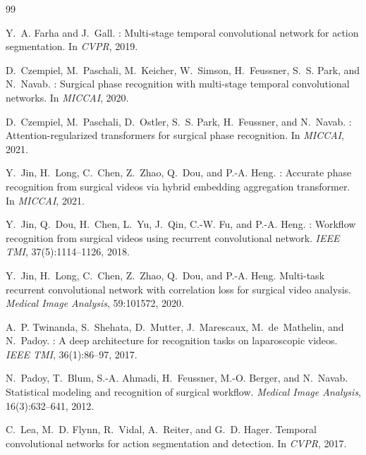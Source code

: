 \documentclass[10pt,twocolumn]{article}
\begin{document}

\begin{thebibliography}{99}

Y.~A. Farha and J.~Gall.
: Multi-stage temporal convolutional network for action segmentation.
\newblock In \emph{CVPR}, 2019.

D.~Czempiel, M.~Paschali, M.~Keicher, W.~Simson, H.~Feussner, S.~S. Park, and N.~Navab.
: Surgical phase recognition with multi-stage temporal convolutional networks.
\newblock In \emph{MICCAI}, 2020.

D.~Czempiel, M.~Paschali, D.~Ostler, S.~S. Park, H.~Feussner, and N.~Navab.
: Attention-regularized transformers for surgical phase recognition.
\newblock In \emph{MICCAI}, 2021.

Y.~Jin, H.~Long, C.~Chen, Z.~Zhao, Q.~Dou, and P.-A. Heng.
: Accurate phase recognition from surgical videos via hybrid embedding aggregation transformer.
\newblock In \emph{MICCAI}, 2021.

Y.~Jin, Q.~Dou, H.~Chen, L.~Yu, J.~Qin, C.-W. Fu, and P.-A. Heng.
: Workflow recognition from surgical videos using recurrent convolutional network.
\newblock \emph{IEEE TMI}, 37(5):1114--1126, 2018.

Y.~Jin, H.~Long, C.~Chen, Z.~Zhao, Q.~Dou, and P.-A. Heng.
\newblock Multi-task recurrent convolutional network with correlation loss for surgical video analysis.
\newblock \emph{Medical Image Analysis}, 59:101572, 2020.

A.~P. Twinanda, S.~Shehata, D.~Mutter, J.~Marescaux, M.~de~Mathelin, and N.~Padoy.
: A deep architecture for recognition tasks on laparoscopic videos.
\newblock \emph{IEEE TMI}, 36(1):86--97, 2017.

N.~Padoy, T.~Blum, S.-A. Ahmadi, H.~Feussner, M.-O. Berger, and N.~Navab.
\newblock Statistical modeling and recognition of surgical workflow.
\newblock \emph{Medical Image Analysis}, 16(3):632--641, 2012.

C.~Lea, M.~D. Flynn, R.~Vidal, A.~Reiter, and G.~D. Hager.
\newblock Temporal convolutional networks for action segmentation and detection.
\newblock In \emph{CVPR}, 2017.


\end{thebibliography}
\end{document}
